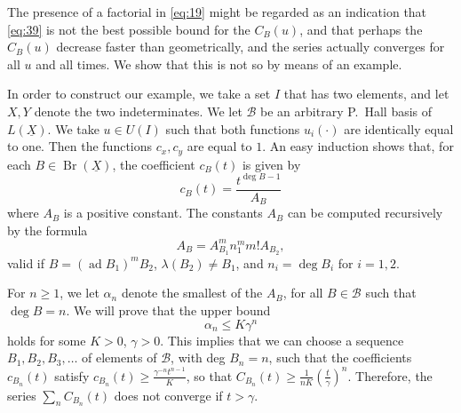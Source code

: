 \documentclass[leqno]{article}
\theoremstyle{plain}
\newcommand{\Br}{\operatorname{Br}(\underline{X})}
\begin{document}
The presence of a factorial in \eqref{eq:19} might be regarded as an indication that \eqref{eq:39} is not the best possible bound for the $C_{B}(u)$, and that perhaps the $C_{B}(u)$ decrease faster than geometrically, and the series actually converges for all $u$ and all times. We show that this is not so by means of an example.

In order to construct our example, we take a set $I$ that has two elements, and let $X, Y$ denote the two indeterminates. 
We let $\mathcal{B}$ be an arbitrary P.\ Hall basis of $L(\underline{X})$. 
We take $u \in U(I)$ such that both functions $u_{i}(\cdot)$ are identically equal to one. 
Then the functions $c_{x}, c_{y}$ are equal to $1$.
An easy induction shows that, for each $B \in \Br$, the coefficient $c_{B}(t)$ is given by
\begin{equation}
	c_{B}(t)=\frac{t^{\operatorname{deg} B-1}}{A_{B}}
\end{equation}
where $A_{B}$ is a positive constant. 
The constants $A_{B}$ can be computed recursively by the formula
\begin{equation}
	A_B = A_{B_1}^m n_1^m m! A_{B_2},
\end{equation}
valid if $B = (\operatorname{ad} B_1)^m B_2$, $\lambda(B_2) \neq B_1$, and $n_i = \operatorname{deg} B_i$ for $i = 1,2$.

For $n \geq 1$, we let $\alpha_n$ denote the smallest of the $A_B$, for all $B \in \mathcal{B}$ such that $\operatorname{deg} B = n$.
We will prove that the upper bound
\begin{equation} \label{eq:44}
	\alpha_n \leq K \gamma^n
\end{equation}
holds for some $K>0$, $\gamma>0$. 
This implies that we can choose a sequence $B_1, B_2, B_{3}, \ldots$ of elements of $\mathcal{B}$, with deg $B_{n}=n$, such that the coefficients $c_{B_n}(t)$ satisfy $c_{B_{n}}(t) \geq \frac{\gamma^{-n} t^{n-1}}{K}$, so that $C_{B_{n}}(t) \geq \frac{1}{n K}\left(\frac{t}{\gamma}\right)^{n}$.
Therefore, the series $\sum_{n} C_{B_{n}}(t)$ does not converge if $t>\gamma$.
\end{document}
